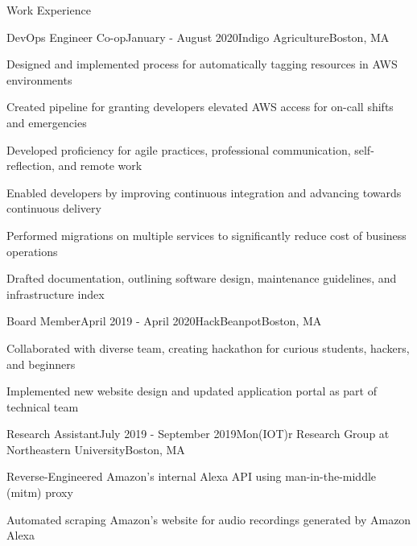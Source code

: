 \documentclass{resume}
\begin{document}
\begin{rSection}{Work Experience}

\begin{rSubsection}{DevOps Engineer Co-op}{January - August 2020}{Indigo Agriculture}{Boston, MA}
\item Designed and implemented process for automatically tagging resources in AWS environments
\item Created pipeline for granting developers elevated AWS access for on-call shifts and emergencies
\item Developed proficiency for agile practices, professional communication, self-reflection, and remote work
\item Enabled developers by improving continuous integration and advancing towards continuous delivery
\item Performed migrations on multiple services to significantly reduce cost of business operations
\item Drafted documentation, outlining software design, maintenance guidelines, and infrastructure index
\end{rSubsection}

\begin{rSubsection}{Board Member}{April 2019 - April 2020}{HackBeanpot}{Boston, MA}
\item Collaborated with diverse team, creating hackathon for curious students, hackers, and beginners
\item Implemented new website design and updated application portal as part of technical team
\end{rSubsection}

\begin{rSubsection}{Research Assistant}{July 2019 - September 2019}{Mon(IOT)r Research Group at Northeastern University}{Boston, MA}
\item Reverse-Engineered Amazon's internal Alexa API using man-in-the-middle (mitm) proxy 
\item Automated scraping Amazon's website for audio recordings generated by Amazon Alexa
\end{rSubsection}
\end{rSection}
\end{document}
